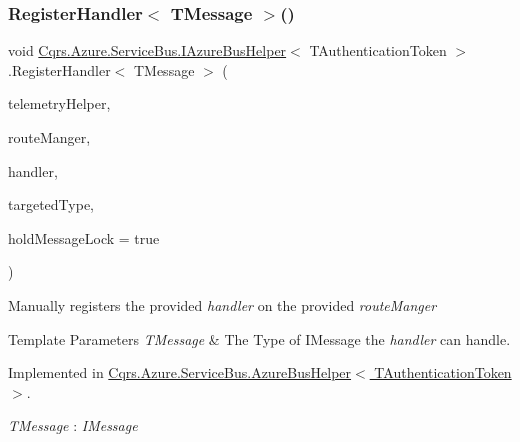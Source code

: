 \subsubsection{\texorpdfstring{Register\+Handler$<$ T\+Message $>$()}{RegisterHandler< TMessage >()}}
{\footnotesize\ttfamily void \hyperlink{interfaceCqrs_1_1Azure_1_1ServiceBus_1_1IAzureBusHelper}{Cqrs.\+Azure.\+Service\+Bus.\+I\+Azure\+Bus\+Helper}$<$ T\+Authentication\+Token $>$.Register\+Handler$<$ T\+Message $>$ (\begin{DoxyParamCaption}\item[{I\+Telemetry\+Helper}]{telemetry\+Helper,  }\item[{\hyperlink{classCqrs_1_1Bus_1_1RouteManager}{Route\+Manager}}]{route\+Manger,  }\item[{Action$<$ T\+Message $>$}]{handler,  }\item[{Type}]{targeted\+Type,  }\item[{bool}]{hold\+Message\+Lock = {\ttfamily true} }\end{DoxyParamCaption})}



Manually registers the provided {\itshape handler}  on the provided {\itshape route\+Manger}  


\begin{DoxyTemplParams}{Template Parameters}
{\em T\+Message} & The Type of I\+Message the {\itshape handler}  can handle.\\
\hline
\end{DoxyTemplParams}


Implemented in \hyperlink{classCqrs_1_1Azure_1_1ServiceBus_1_1AzureBusHelper_a3b8dd8410756ffdc67782dde8f2519ff_a3b8dd8410756ffdc67782dde8f2519ff}{Cqrs.\+Azure.\+Service\+Bus.\+Azure\+Bus\+Helper$<$ T\+Authentication\+Token $>$}.

\begin{Desc}
\item[Type Constraints]\begin{description}
\item[{\em T\+Message} : {\em I\+Message}]\end{description}
\end{Desc}
